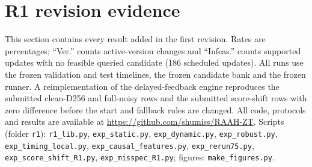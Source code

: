 \section{R1 revision evidence}
\label{sec:supp_r1}
This section contains every result added in the first revision. Rates are percentages; ``Ver.'' counts active-version
changes and ``Infeas.'' counts supported updates with no feasible queried candidate (186 scheduled updates).
All runs use the frozen validation and test timelines, the frozen candidate bank and the frozen runner. A
reimplementation of the delayed-feedback engine reproduces the submitted clean-D256 and full-noisy rows and the
submitted score-shift rows with zero difference before the start and fallback rules are changed. All code,
protocols and results are available at \url{https://github.com/shumiss/RAAH-ZT}. Scripts (folder \texttt{r1}):
\texttt{r1\_lib.py}, \texttt{exp\_static.py}, \texttt{exp\_dynamic.py}, \texttt{exp\_robust.py},
\texttt{exp\_timing\_local.py}, \texttt{exp\_causal\_features.py}, \texttt{exp\_rerun75.py},
\texttt{exp\_score\_shift\_R1.py}, \texttt{exp\_misspec\_R1.py}; figures: \texttt{make\_figures.py}.


